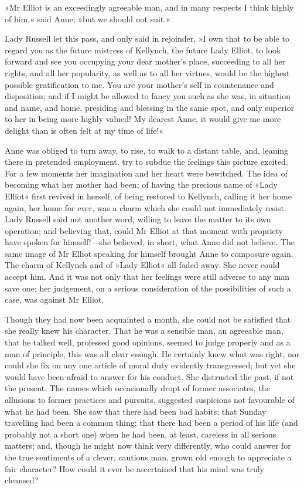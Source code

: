 »Mr Elliot is an exceedingly agreeable man, and in many respects I think highly of him,« said Anne; »but we should not suit.«

Lady Russell let this pass, and only said in rejoinder, »I own that to be able to regard you as the future mistress of Kellynch, the future Lady Elliot, to look forward and see you occupying your dear mother's place, succeeding to all her rights, and all her popularity, as well as to all her virtues, would be the highest possible gratification to me. You are your mother's self in countenance and disposition; and if I might be allowed to fancy you such as she was, in situation and name, and home, presiding and blessing in the same spot, and only superior to her in being more highly valued! My dearest Anne, it would give me more delight than is often felt at my time of life!«

Anne was obliged to turn away, to rise, to walk to a distant table, and, leaning there in pretended employment, try to subdue the feelings this picture excited. For a few moments her imagination and her heart were bewitched. The idea of becoming what her mother had been; of having the precious name of »Lady Elliot« first revived in herself; of being restored to Kellynch, calling it her home again, her home for ever, was a charm which she could not immediately resist. Lady Russell said not another word, willing to leave the matter to its own operation; and believing that, could Mr Elliot at that moment with propriety have spoken for himself!—she believed, in short, what Anne did not believe. The same image of Mr Elliot speaking for himself brought Anne to composure again. The charm of Kellynch and of »Lady Elliot« all faded away. She never could accept him. And it was not only that her feelings were still adverse to any man save one; her judgement, on a serious consideration of the possibilities of such a case, was against Mr Elliot.

Though they had now been acquainted a month, she could not be satisfied that she really knew his character. That he was a sensible man, an agreeable man, that he talked well, professed good opinions, seemed to judge properly and as a man of principle, this was all clear enough. He certainly knew what was right, nor could she fix on any one article of moral duty evidently transgressed; but yet she would have been afraid to answer for his conduct. She distrusted the past, if not the present. The names which occasionally dropt of former associates, the allusions to former practices and pursuits, suggested suspicions not favourable of what he had been. She saw that there had been bad habits; that Sunday travelling had been a common thing; that there had been a period of his life (and probably not a short one) when he had been, at least, careless in all serious matters; and, though he might now think very differently, who could answer for the true sentiments of a clever, cautious man, grown old enough to appreciate a fair character? How could it ever be ascertained that his mind was truly cleansed?

